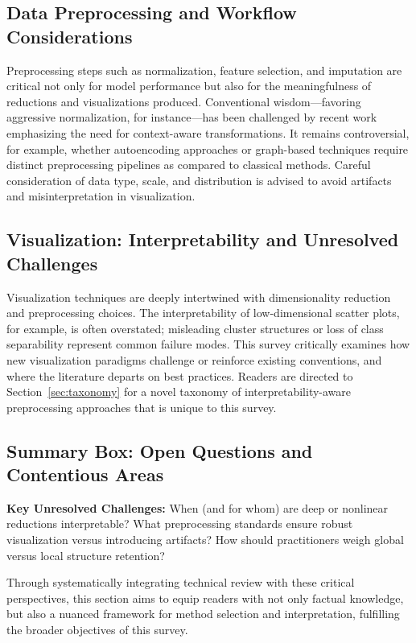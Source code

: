 \documentclass[sigconf]{acmart}
\begin{document}
\subsection*{Data Preprocessing and Workflow Considerations}
Preprocessing steps such as normalization, feature selection, and imputation are critical not only for model performance but also for the meaningfulness of reductions and visualizations produced. Conventional wisdom---favoring aggressive normalization, for instance---has been challenged by recent work emphasizing the need for context-aware transformations. It remains controversial, for example, whether autoencoding approaches or graph-based techniques require distinct preprocessing pipelines as compared to classical methods. Careful consideration of data type, scale, and distribution is advised to avoid artifacts and misinterpretation in visualization.

\subsection*{Visualization: Interpretability and Unresolved Challenges}
Visualization techniques are deeply intertwined with dimensionality reduction and preprocessing choices. The interpretability of low-dimensional scatter plots, for example, is often overstated; misleading cluster structures or loss of class separability represent common failure modes. This survey critically examines how new visualization paradigms challenge or reinforce existing conventions, and where the literature departs on best practices. Readers are directed to Section~\ref{sec:taxonomy} for a novel taxonomy of interpretability-aware preprocessing approaches that is unique to this survey.

\subsection*{Summary Box: Open Questions and Contentious Areas}
\textbf{Key Unresolved Challenges:} When (and for whom) are deep or nonlinear reductions interpretable? What preprocessing standards ensure robust visualization versus introducing artifacts? How should practitioners weigh global versus local structure retention?

Through systematically integrating technical review with these critical perspectives, this section aims to equip readers with not only factual knowledge, but also a nuanced framework for method selection and interpretation, fulfilling the broader objectives of this survey.
\end{document}
